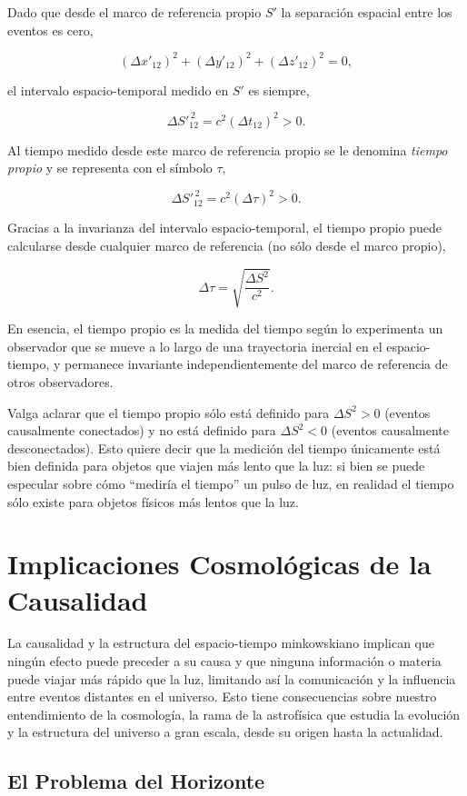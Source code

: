 Dado que desde el marco de referencia propio $S'$ la separación espacial entre los eventos es cero,

$$
(\Delta x'_{12})^2 + (\Delta y'_{12})^2 + (\Delta z'_{12})^2 = 0,
$$

el intervalo espacio-temporal medido en $S'$ es siempre,

$$
\Delta S'^{\,2}_{12} = c^2(\Delta t_{12})^2 > 0.
$$

Al tiempo medido desde este marco de referencia propio se le denomina \emph{tiempo propio} y se representa con el símbolo $\tau$,

$$
\Delta S'^{\,2}_{12} = c^2(\Delta \tau)^2 > 0.
$$

Gracias a la invarianza del intervalo espacio-temporal, el tiempo propio puede calcularse desde cualquier marco de referencia (no sólo desde el marco propio),

$$
\Delta \tau = \sqrt{\frac{\Delta S^2}{c^2}}.
$$

En esencia, el tiempo propio es la medida del tiempo según lo experimenta un observador que se mueve a lo largo de una trayectoria inercial en el espacio-tiempo, y permanece invariante independientemente del marco de referencia de otros observadores.

Valga aclarar que el tiempo propio sólo está definido para $\Delta S^2 > 0$ (eventos causalmente conectados) y no está definido para $\Delta S^2 < 0$ (eventos causalmente desconectados). Esto quiere decir que la medición del tiempo únicamente está bien definida para objetos que viajen más lento que la luz: si bien se puede especular sobre cómo ``mediría el tiempo'' un pulso de luz, en realidad el tiempo sólo existe para objetos físicos más lentos que la luz.

\section{Implicaciones Cosmológicas de la Causalidad}

La causalidad y la estructura del espacio-tiempo minkowskiano implican que ningún efecto puede preceder a su causa y que ninguna información o materia puede viajar más rápido que la luz, limitando así la comunicación y la influencia entre eventos distantes en el universo. Esto tiene consecuencias sobre nuestro entendimiento de la cosmología, la rama de la astrofísica que estudia la evolución y la estructura del universo a gran escala, desde su origen hasta la actualidad.

\subsection{El Problema del Horizonte}

